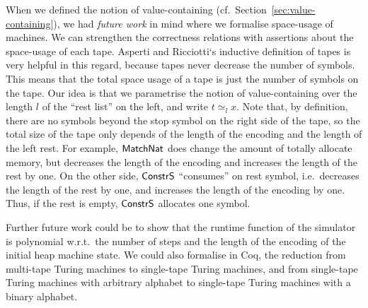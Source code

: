 When we defined the notion of value-containing (cf.\ Section~\ref{sec:value-containing}), we had \emph{future work} in mind where we formalise
space-usage of machines.  We can strengthen the correctness relations with assertions about the space-usage of each tape.  Asperti and Ricciotti`s
inductive definition of tapes is very helpful in this regard, because tapes never decrease the number of symbols.  This means that the total space
usage of a tape is just the number of symbols on the tape.  Our idea is that we parametrise the notion of value-containing over the length $l$ of the
``rest list'' on the left, and write $t \simeq_{l} x$.  Note that, by definition, there are no symbols beyond the stop symbol on the right side of the
tape, so the total size of the tape only depends of the length of the encoding and the length of the left rest.  For example, $\mathsf{MatchNat}$ does
change the amount of totally allocate memory, but decreases the length of the encoding and increases the length of the rest by one.  On the other
side, $\mathsf{ConstrS}$ ``consumes'' on rest symbol, i.e.\ decreases the length of the rest by one, and increases the length of the encoding by one.
Thus, if the rest is empty, $\mathsf{ConstrS}$ allocates one symbol.

Further future work could be to show that the runtime function of the simulator is polynomial w.r.t.\ the number of steps and the length of the
encoding of the initial heap machine state.  We could also formalise in Coq, the reduction from multi-tape Turing machines to single-tape Turing
machines, and from single-tape Turing machines with arbitrary alphabet to single-tape Turing machines with a binary alphabet.


